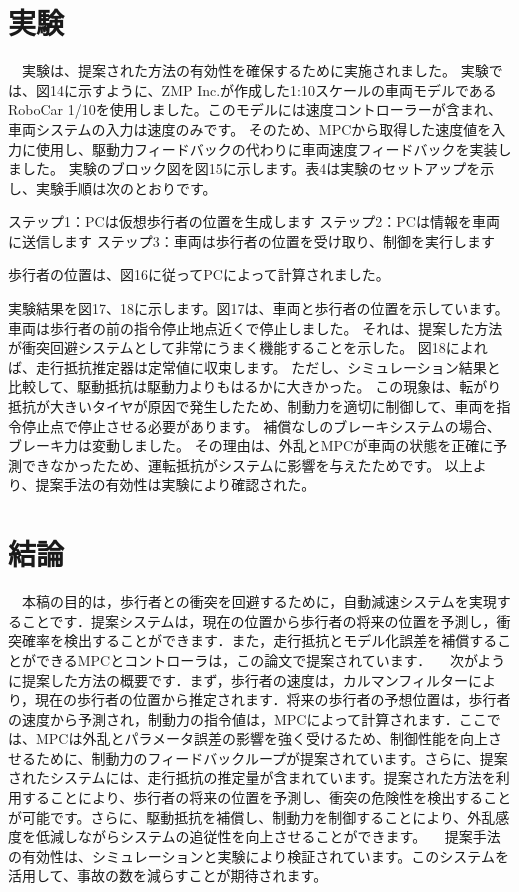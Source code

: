 \section{実験}
　実験は、提案された方法の有効性を確保するために実施されました。 実験では、図14に示すように、ZMP Inc.が作成した1:10スケールの車両モデルであるRoboCar 1/10を使用しました。このモデルには速度コントローラーが含まれ、車両システムの入力は速度のみです。 そのため、MPCから取得した速度値を入力に使用し、駆動力フィードバックの代わりに車両速度フィードバックを実装しました。 実験のブロック図を図15に示します。表4は実験のセットアップを示し、実験手順は次のとおりです。

ステップ1：PCは仮想歩行者の位置を生成します
ステップ2：PCは情報を車両に送信します
ステップ3：車両は歩行者の位置を受け取り、制御を実行します

歩行者の位置は、図16に従ってPCによって計算されました。

実験結果を図17、18に示します。図17は、車両と歩行者の位置を示しています。 車両は歩行者の前の指令停止地点近くで停止しました。 それは、提案した方法が衝突回避システムとして非常にうまく機能することを示した。 図18によれば、走行抵抗推定器は定常値に収束します。 ただし、シミュレーション結果と比較して、駆動抵抗は駆動力よりもはるかに大きかった。 この現象は、転がり抵抗が大きいタイヤが原因で発生したため、制動力を適切に制御して、車両を指令停止点で停止させる必要があります。 補償なしのブレーキシステムの場合、ブレーキ力は変動しました。 その理由は、外乱とMPCが車両の状態を正確に予測できなかったため、運転抵抗がシステムに影響を与えたためです。 以上より、提案手法の有効性は実験により確認された。

\section{結論}
　本稿の目的は，歩行者との衝突を回避するために，自動減速システムを実現することです．提案システムは，現在の位置から歩行者の将来の位置を予測し，衝突確率を検出することができます．また，走行抵抗とモデル化誤差を補償することができるMPCとコントローラは，この論文で提案されています．
　次がように提案した方法の概要です．まず，歩行者の速度は，カルマンフィルターにより，現在の歩行者の位置から推定されます．将来の歩行者の予想位置は，歩行者の速度から予測され，制動力の指令値は，MPCによって計算されます．ここでは、MPCは外乱とパラメータ誤差の影響を強く受けるため、制御性能を向上させるために、制動力のフィードバックループが提案されています。さらに、提案されたシステムには、走行抵抗の推定量が含まれています。提案された方法を利用することにより、歩行者の将来の位置を予測し、衝突の危険性を検出することが可能です。さらに、駆動抵抗を補償し、制動力を制御することにより、外乱感度を低減しながらシステムの追従性を向上させることができます。
　提案手法の有効性は、シミュレーションと実験により検証されています。このシステムを活用して、事故の数を減らすことが期待されます。





